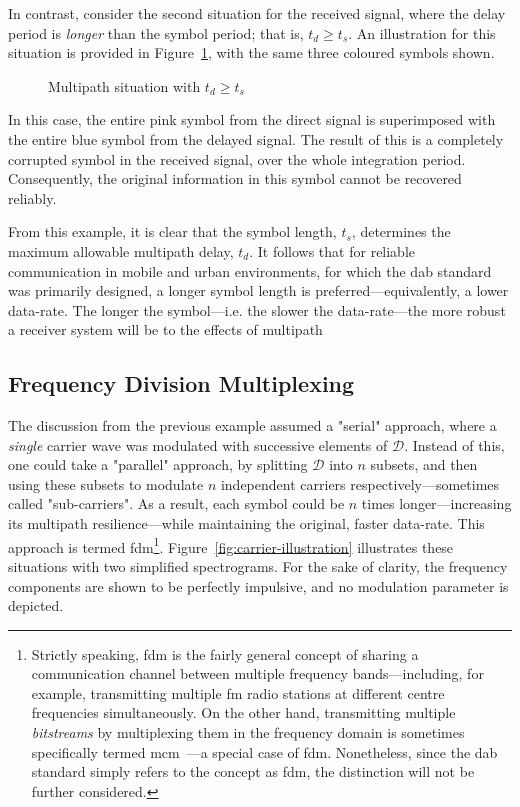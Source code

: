 \documentclass[class=report,11pt,crop=false]{standalone}
\begin{document}
In contrast, consider the second situation for the received signal, where the delay period is \emph{longer} than the symbol period; that is, \(t_d \ge t_s\). An illustration for this situation is provided in Figure~\ref{fig:multipath-symbol-morethan}, with the same three coloured symbols shown.

\begin{figure}[htbp]
    \centering
    \captionsetup{type=figure}
    \def\svgwidth{0.8\linewidth}
    { %
        }
    \caption{Multipath situation with \(t_d \ge t_s\)}
    \label{fig:multipath-symbol-morethan}
\end{figure}

In this case, the entire pink symbol from the direct signal is superimposed with the entire blue symbol from the delayed signal. The result of this is a completely corrupted symbol in the received signal, over the whole integration period. Consequently, the original information in this symbol cannot be recovered reliably.

From this example, it is clear that the symbol length, \(t_s\), determines the maximum allowable multipath delay, \(t_d\). It follows that for reliable communication in mobile and urban environments, for which the \gls{dab} standard was primarily designed, a longer symbol length is preferred---equivalently, a lower data-rate. The longer the symbol---i.e. the slower the data-rate---the more robust a receiver system will be to the effects of multipath

\subsection{Frequency Division Multiplexing}
The discussion from the previous example assumed a "serial" approach, where a \emph{single} carrier wave was modulated with successive elements of \(\mathcal{D}\). Instead of this, one could take a "parallel" approach, by splitting \(\mathcal{D}\) into \(n\) subsets, and then using these subsets to modulate \(n\) independent carriers respectively---sometimes called "sub-carriers". As a result, each symbol could be \(n\) times longer---increasing its multipath resilience---while maintaining the original, faster data-rate. This approach is termed \gls{fdm}\footnote{Strictly speaking, \gls{fdm} is the fairly general concept of sharing a communication channel between multiple frequency bands---including, for example, transmitting multiple \gls{fm} radio stations at different centre frequencies simultaneously. On the other hand, transmitting multiple \emph{bitstreams} by multiplexing them in the frequency domain is sometimes specifically termed \gls{mcm}~\cite{Bingham1990}---a special case of \gls{fdm}. Nonetheless, since the \gls{dab} standard simply refers to the concept as \gls{fdm}, the distinction will not be further considered.}. Figure~\ref{fig:carrier-illustration} illustrates these situations with two simplified spectrograms. For the sake of clarity, the frequency components are shown to be perfectly impulsive, and no modulation parameter is depicted.
\end{document}
